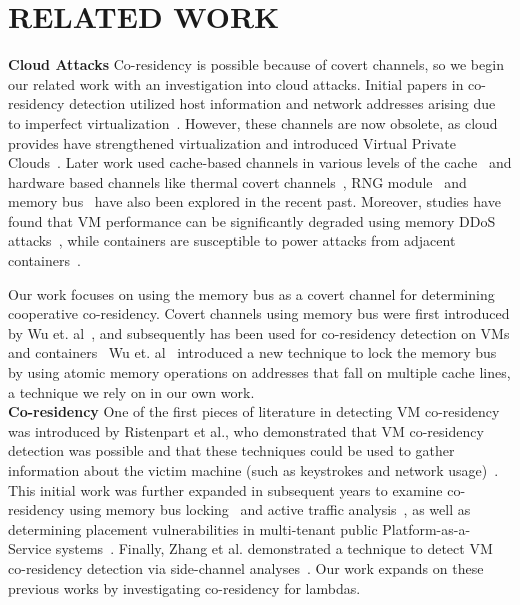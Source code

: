 \section{RELATED WORK}
\label{sec:relatedwork}

\noindent \textbf{Cloud Attacks} 
Co-residency is possible because of covert channels, so we begin our related
work with an investigation into cloud attacks. Initial papers in co-residency
detection utilized host information and network addresses arising due to
imperfect virtualization~\cite{ristenpartccs2009}.  However, these channels are
now obsolete, as cloud provides have strengthened virtualization and introduced
Virtual Private Clouds~\cite{awsvpc}. Later work used cache-based channels in
various levels of the cache~\cite{xuccsw2011, zhangccs2014, liu2015,
kaylaap2016} and hardware based channels like thermal covert
channels~\cite{mastiusenix2015}, RNG module~\cite{evtyushkinccs2016} and memory
bus~\cite{wuusenix2012} have also been explored in the recent past. Moreover,
studies have found that VM performance can be significantly degraded using
memory DDoS attacks~\cite{zhang2016memory}, while containers are susceptible to
power attacks from adjacent containers~\cite{gao2017}.  

Our work focuses on using the memory bus as a covert channel for determining
cooperative co-residency.  Covert channels using memory bus were first
introduced by Wu et. al~\cite{wuusenix2012}, and subsequently has been used for
co-residency detection on VMs and containers~\cite{zhang2011,varad191016} Wu
et. al~\cite{wuusenix2012} introduced a new technique to lock the memory bus by
using atomic memory operations on addresses that fall on multiple cache lines, a
technique we rely on in our own work. \\

\noindent \textbf{Co-residency} 
One of the first pieces of literature in detecting VM co-residency was
introduced by Ristenpart et al., who demonstrated that VM co-residency detection
was possible and that these techniques could be used to gather information about
the victim machine (such as keystrokes and network
usage)~\cite{ristenpartccs2009}. This initial work was further expanded in
subsequent years to examine co-residency using memory bus
locking~\cite{xuusenix2015} and active traffic analysis~\cite{bates2012}, as
well as determining placement vulnerabilities in multi-tenant public
Platform-as-a-Service systems~\cite{varadarajan2015, zhangpaas2016}. Finally,
Zhang et al. demonstrated a technique to detect VM co-residency detection via
side-channel analyses~\cite{zhang2011}. Our work expands on these previous works
by investigating co-residency for lambdas.\\

